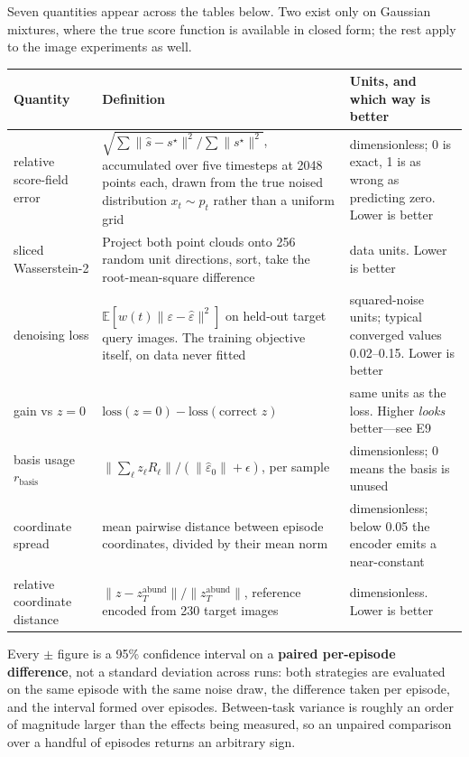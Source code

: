 \documentclass[11pt]{article}
\newcommand{\epshat}{\hat{\varepsilon}}
\begin{document}
Seven quantities appear across the tables below. Two exist only on Gaussian mixtures, where the
true score function is available in closed form; the rest apply to the image experiments as well.

\begin{table}[htbp]
\centering\small
\begin{tabular}{@{}p{3.1cm}p{6.3cm}p{4.6cm}@{}}
\toprule
\textbf{Quantity} & \textbf{Definition} & \textbf{Units, and which way is better} \\
\midrule
relative score-field error
  & $\sqrt{\sum\|\hat{s}-s^{\star}\|^2 \big/ \sum\|s^{\star}\|^2}$, accumulated over five
    timesteps at 2048 points each, drawn from the true noised distribution $x_t\sim p_t$ rather
    than a uniform grid
  & dimensionless; 0 is exact, 1 is as wrong as predicting zero. Lower is better \\[2pt]
sliced Wasserstein-2
  & Project both point clouds onto 256 random unit directions, sort, take the root-mean-square
    difference
  & data units. Lower is better \\[2pt]
denoising loss
  & $\mathbb{E}[w(t)\|\varepsilon-\epshat\|^2]$ on held-out target query images. The training
    objective itself, on data never fitted
  & squared-noise units; typical converged values 0.02--0.15. Lower is better \\[2pt]
gain vs $z=0$
  & $\text{loss}(z{=}0)-\text{loss}(\text{correct }z)$
  & same units as the loss. Higher \emph{looks} better---see E9 \\[2pt]
basis usage $r_{\text{basis}}$
  & $\|\sum_\ell z_\ell R_\ell\| / (\|\epshat_0\|+\epsilon)$, per sample
  & dimensionless; 0 means the basis is unused \\[2pt]
coordinate spread
  & mean pairwise distance between episode coordinates, divided by their mean norm
  & dimensionless; below 0.05 the encoder emits a near-constant \\[2pt]
relative coordinate distance
  & $\|z-z^{\text{abund}}_T\| / \|z^{\text{abund}}_T\|$, reference encoded from 230 target images
  & dimensionless. Lower is better \\
\bottomrule
\end{tabular}
\end{table}

Every $\pm$ figure is a 95\% confidence interval on a \textbf{paired per-episode difference}, not a
standard deviation across runs: both strategies are evaluated on the same episode with the same
noise draw, the difference taken per episode, and the interval formed over episodes. Between-task
variance is roughly an order of magnitude larger than the effects being measured, so an unpaired
comparison over a handful of episodes returns an arbitrary sign.
\end{document}
